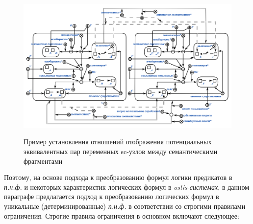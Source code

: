 \begin{figure}[H]
	\caption{Пример установления отношений отображения потенциальных эквивалентных пар переменных sc-узлов между семантическими фрагментами}
	\includegraphics[scale=0.65]{author/part7/figures/establishment_mapping_relationship_example.png}
	\label{fig:EMR_example}
\end{figure}

Поэтому, на основе подхода к преобразованию формул логики предикатов в \textit{п.н.ф.} и некоторых характеристик логических формул в \textit{ostis-системах}, в данном параграфе предлагается подход к преобразованию логических формул в уникальные (детерминированные) \textit{п.н.ф.} в соответствии со строгими правилами ограничения. Строгие правила ограничения в основном включают следующее:

